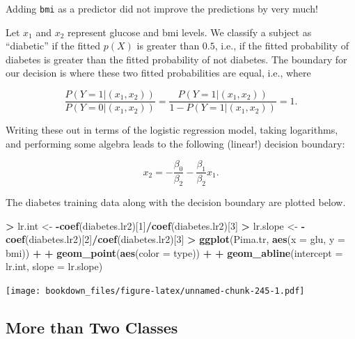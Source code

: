 \documentclass[]{krantz}
\makeatletter
\newenvironment{Shaded}{\begin{snugshade}}{\end{snugshade}}
\newcommand{\KeywordTok}[1]{\textcolor[rgb]{0.27,0.27,0.27}{\textbf{#1}}}
\newcommand{\DataTypeTok}[1]{\textcolor[rgb]{0.27,0.27,0.27}{#1}}
\newcommand{\DecValTok}[1]{\textcolor[rgb]{0.06,0.06,0.06}{#1}}
\newcommand{\StringTok}[1]{\textcolor[rgb]{0.5,0.5,0.5}{#1}}
\newcommand{\OperatorTok}[1]{\textcolor[rgb]{0.43,0.43,0.43}{\textbf{#1}}}
\newcommand{\NormalTok}[1]{#1}
\newenvironment{kframe}{%
\medskip{}
\setlength{\fboxsep}{.8em}
 \def\at@end@of@kframe{}%
 \ifinner\ifhmode%
  \def\at@end@of@kframe{\end{minipage}}%
  \begin{minipage}{\columnwidth}%
 \fi\fi%
 \def\FrameCommand##1{\hskip\@totalleftmargin \hskip-\fboxsep
 \colorbox{shadecolor}{##1}\hskip-\fboxsep
     \hskip-\linewidth \hskip-\@totalleftmargin \hskip\columnwidth}%
 \MakeFramed {\advance\hsize-\width
   \@totalleftmargin\z@ \linewidth\hsize
   \@setminipage}}%
 {\par\unskip\endMakeFramed%
 \at@end@of@kframe}
\renewenvironment{Shaded}{\begin{kframe}}{\end{kframe}}
\makeatother
\begin{document}
Adding \texttt{bmi} as a predictor did not improve the predictions by
very much!

Let \(x_1\) and \(x_2\) represent glucose and bmi levels. We classify a
subject as ``diabetic'' if the fitted \(p(X)\) is greater than \(0.5\),
i.e., if the fitted probability of diabetes is greater than the fitted
probability of not diabetes. The boundary for our decision is where
these two fitted probabilities are equal, i.e., where

\[
\frac{P(Y = 1 | (x_1, x_2))}{P(Y = 0 | (x_1, x_2))} = \frac{P(Y = 1 | (x_1, x_2))}{1 - P(Y = 1 | (x_1, x_2))}  = 1.
\]

Writing these out in terms of the logistic regression model, taking
logarithms, and performing some algebra leads to the following (linear!)
decision boundary:

\[
x_2 = -\frac{\beta_0}{\beta_2} - \frac{\beta_1}{\beta_2} x_1.
\]

The diabetes training data along with the decision boundary are plotted
below.

\begin{Shaded}
\begin{Highlighting}[]
\OperatorTok{>}\StringTok{ }\NormalTok{lr.int <-}\StringTok{ }\OperatorTok{-}\KeywordTok{coef}\NormalTok{(diabetes.lr2)[}\DecValTok{1}\NormalTok{]}\OperatorTok{/}\KeywordTok{coef}\NormalTok{(diabetes.lr2)[}\DecValTok{3}\NormalTok{]}
\OperatorTok{>}\StringTok{ }\NormalTok{lr.slope <-}\StringTok{ }\OperatorTok{-}\KeywordTok{coef}\NormalTok{(diabetes.lr2)[}\DecValTok{2}\NormalTok{]}\OperatorTok{/}\KeywordTok{coef}\NormalTok{(diabetes.lr2)[}\DecValTok{3}\NormalTok{]}
\OperatorTok{>}\StringTok{ }\KeywordTok{ggplot}\NormalTok{(Pima.tr, }\KeywordTok{aes}\NormalTok{(}\DataTypeTok{x =}\NormalTok{ glu, }\DataTypeTok{y =}\NormalTok{ bmi)) }\OperatorTok{+}\StringTok{ }
\OperatorTok{+}\StringTok{   }\KeywordTok{geom_point}\NormalTok{(}\KeywordTok{aes}\NormalTok{(}\DataTypeTok{color =}\NormalTok{ type)) }\OperatorTok{+}\StringTok{ }
\OperatorTok{+}\StringTok{   }\KeywordTok{geom_abline}\NormalTok{(}\DataTypeTok{intercept =}\NormalTok{ lr.int, }\DataTypeTok{slope =}\NormalTok{ lr.slope)}
\end{Highlighting}
\end{Shaded}

\texttt{[image: bookdown\_files/figure-latex/unnamed-chunk-245-1.pdf]}

\subsection{More than Two Classes}\label{more-than-two-classes}
\end{document}
